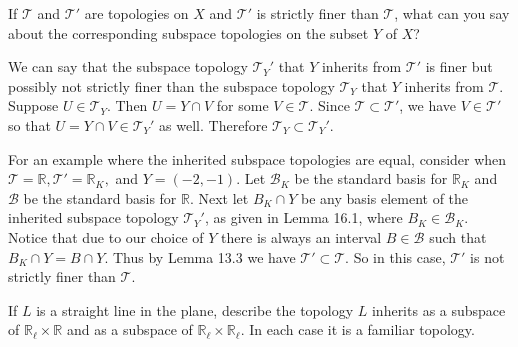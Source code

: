 \documentclass[11pt]{article}
\begin{document}



\begin{ex}{16.2}
  If $\mathcal{T}$ and $\mathcal{T}'$ are topologies on $X$ and $\mathcal{T}'$
  is strictly finer than $\mathcal{T}$, what can you say about the corresponding
  subspace topologies on the subset $Y$ of $X$?
\end{ex}

\begin{solution}
  We can say that the subspace topology $\mathcal{T}_Y'$ that $Y$ inherits from
  $\mathcal{T}'$ is finer but possibly not strictly finer than the subspace
  topology $\mathcal{T}_Y$ that $Y$ inherits from $\mathcal{T}$. Suppose $U \in
  \mathcal{T}_Y$. Then $U = Y \cap V$ for some $V \in \mathcal{T}$. Since
  $\mathcal{T} \subset \mathcal{T}'$, we have $V \in \mathcal{T}'$ so that $U =
  Y \cap V \in \mathcal{T}_Y'$ as well. Therefore $\mathcal{T}_Y \subset
  \mathcal{T}_Y'$.

  For an example where the inherited subspace topologies are equal, consider
  when $\mathcal{T} = \mathbb{R}, \mathcal{T}' = \mathbb{R}_K,$ and $Y = (-2,
  -1).$ Let $\mathcal{B}_K$ be the standard basis for $\mathbb{R}_K$ and
  $\mathcal{B}$ be the standard basis for $\mathbb{R}$. Next let $B_K
  \cap Y$ be any basis element of the inherited subspace topology
  $\mathcal{T}_Y'$, as given in Lemma 16.1, where $B_K \in \mathcal{B}_K.$
  Notice that due to our choice of $Y$ there is always an interval $B \in
  \mathcal{B}$ such that $B_K \cap Y = B \cap Y$. Thus by Lemma 13.3 we have
  $\mathcal{T}' \subset \mathcal{T}.$ So in this case, $\mathcal{T}'$ is not
  strictly finer than $\mathcal{T}$.
\end{solution}

\begin{ex}{16.8}
  If $L$ is a straight line in the plane, describe the topology $L$ inherits as
  a subspace of $\mathbb{R}_\ell \times \mathbb{R}$ and as a subspace of
  \(\mathbb{R}_\ell \times \mathbb{R}_\ell\). In each case it is a familiar
  topology.
\end{ex}
\end{document}
